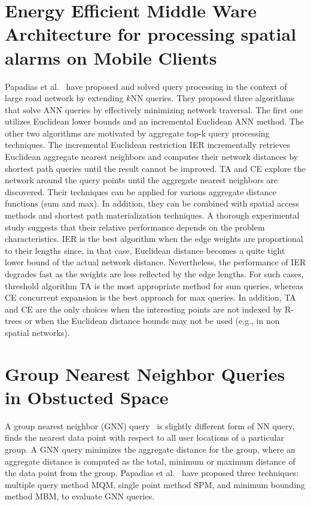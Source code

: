 \section{\label{sec:ANN}Energy Efficient Middle Ware Architecture for processing spatial alarms on Mobile Clients}
Papadias et al.~\cite{ANN1} have proposed and solved query processing in the context of large road network by extending $k$NN queries. They proposed three algorithms that solve ANN queries by effectively minimizing network traversal. The first one utilizes Euclidean lower bounds and an incremental Euclidean ANN method. The other two algorithms are motivated by aggregate top-k query processing techniques. The incremental Euclidean restriction IER incrementally retrieves Euclidean aggregate nearest neighbors and computes their network distances by shortest path queries until the result cannot be improved. TA and CE explore the network around the query points until the aggregate nearest neighbors are discovered. Their techniques can be applied for various aggregate distance functions (sum and max). In addition, they can be combined with spatial access methods and shortest path materialization techniques. A thorough experimental study suggests that their relative performance depends on the problem characteristics. IER is the best algorithm when the edge weights are proportional to their lengths since, in that case, Euclidean distance becomes a quite tight lower bound of the actual network distance. Nevertheless, the performance of IER degrades fast as the weights are less reflected by the edge lengths. For such cases, threshold algorithm TA is the most appropriate method for sum queries, whereas CE concurrent expansion  is the best approach for max queries. In addition, TA and CE are the only choices when the interesting points are not indexed by R-trees or when the Euclidean distance bounds may not be used (e.g., in non spatial networks).


\section{\label{sec:GNN}Group Nearest Neighbor Queries in Obstucted Space}
A group nearest neighbor (GNN) query~\cite{gnn:papa,GNN1,GNN2} is slightly different form of NN query, finds the nearest data point with respect to all user locations of a particular group. A GNN query minimizes the aggregate distance for the group, where an aggregate distance is computed as the total, minimum or maximum distance of the data point from the group. Papadias et al.~\cite{gnn:papa} have proposed three techniques: multiple query method MQM, single point method SPM, and minimum bounding method MBM, to evaluate GNN queries.



